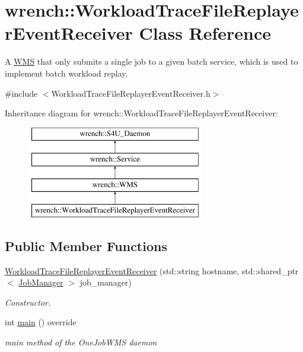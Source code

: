 \hypertarget{classwrench_1_1_workload_trace_file_replayer_event_receiver}{}\section{wrench\+:\+:Workload\+Trace\+File\+Replayer\+Event\+Receiver Class Reference}
\label{classwrench_1_1_workload_trace_file_replayer_event_receiver}


A \hyperlink{classwrench_1_1_w_m_s}{W\+MS} that only submits a single job to a given batch service, which is used to implement batch workload replay.  




{\ttfamily \#include $<$Workload\+Trace\+File\+Replayer\+Event\+Receiver.\+h$>$}

Inheritance diagram for wrench\+:\+:Workload\+Trace\+File\+Replayer\+Event\+Receiver\+:\begin{figure}[H]
\begin{center}
\leavevmode
\includegraphics[height=4.000000cm]{classwrench_1_1_workload_trace_file_replayer_event_receiver}
\end{center}
\end{figure}
\subsection*{Public Member Functions}
\begin{DoxyCompactItemize}
\item 
\hyperlink{classwrench_1_1_workload_trace_file_replayer_event_receiver_abc417862cd19293eb3a44ebbed985b9d}{Workload\+Trace\+File\+Replayer\+Event\+Receiver} (std\+::string hostname, std\+::shared\+\_\+ptr$<$ \hyperlink{classwrench_1_1_job_manager}{Job\+Manager} $>$ job\+\_\+manager)
\begin{DoxyCompactList}\small\item\em Constructor. \end{DoxyCompactList}\item 
int \hyperlink{classwrench_1_1_workload_trace_file_replayer_event_receiver_af8ddb6f527d5f49a8b67bcc8a184c628}{main} () override
\begin{DoxyCompactList}\small\item\em main method of the One\+Job\+W\+MS daemon \end{DoxyCompactList}\end{DoxyCompactItemize}
